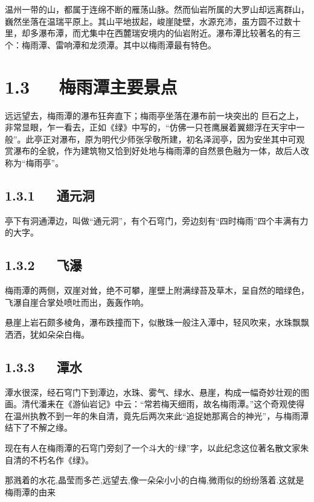 \documentclass[letterpaper,12pt,english]{sphinxmanual}
\begin{document}
温州一带的山，都属于连绵不断的雁荡山脉。然而仙岩所属的大罗山却远离群山，巍然坐落在温瑞平原上。其山平地拔起，峻崖陡壁，水源充沛，虽方圆不过数十里，却多瀑布潭，而尤集中在西麓瑞安境内的仙岩附近。瀑布潭比较著名的有三个：梅雨潭、雷响潭和龙须潭。其中以梅雨潭最有特色。


\section{1.3   梅雨潭主要景点}
\label{\detokenize{p01_u6563_u6587/_u6731_u81ea_u6e05-_u6885_u96e8_u6f6d_u7684_u7eff:id5}}
远远望去，梅雨潭的瀑布狂奔直下；梅雨亭坐落在瀑布前一块突出的
巨石之上，非常显眼，乍一看去，正如《绿》中写的，“仿佛一只苍鹰展着翼翅浮在天宇中一般”。此亭正对瀑布，原为明代少师张孚敬所建，初名泽润亭，因为安坐其中可观赏瀑布的全貌，作为建筑物又恰到好处地与梅雨潭的自然景色融为一体，故后人改称为“梅雨亭”。


\subsection{1.3.1   通元洞}
\label{\detokenize{p01_u6563_u6587/_u6731_u81ea_u6e05-_u6885_u96e8_u6f6d_u7684_u7eff:id6}}
亭下有洞通潭边，叫做“通元洞”，有个石穹门，旁边刻有“四时梅雨”四个丰满有力的大字。


\subsection{1.3.2   飞瀑}
\label{\detokenize{p01_u6563_u6587/_u6731_u81ea_u6e05-_u6885_u96e8_u6f6d_u7684_u7eff:id7}}
梅雨潭的两侧，双崖对耸，绝不可攀，崖壁上附满绿苔及草木，呈自然的暗绿色，飞瀑自崖合掌处喷吐而出，轰轰作响。

悬崖上岩石颇多棱角，瀑布跌撞而下，似散珠一般注入潭中，轻风吹来，水珠飘飘洒洒，犹如朵朵白梅。


\subsection{1.3.3   潭水}
\label{\detokenize{p01_u6563_u6587/_u6731_u81ea_u6e05-_u6885_u96e8_u6f6d_u7684_u7eff:id8}}
潭水很深，经石穹门下到潭边，水珠、雾气、绿水、悬崖，构成一幅奇妙壮观的图画。清代潘耒在《游仙岩记》中云：“常若梅天细雨，故名梅雨潭。”这个奇观使得在温州执教不到一年的朱自清，竟先后两次来此“追捉她那离合的神光”，与梅雨潭结下了不解之缘。

现在有人在梅雨潭的石穹门旁刻了一个斗大的“绿”字，以此纪念这位著名散文家朱自清的不朽名作《绿》。

那溅着的水花,晶莹而多芒,远望去,像一朵朵小小的白梅,微雨似的纷纷落着.这就是梅雨潭的由来
\end{document}
